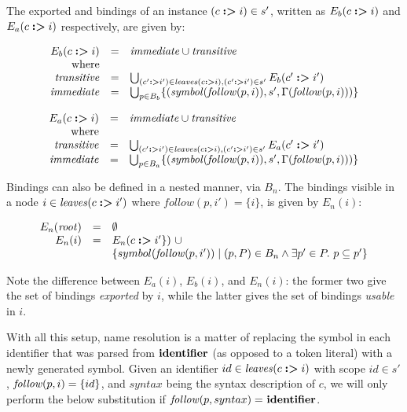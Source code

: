 \documentclass{kththesis}
\begin{document}
The exported  and  bindings of an instance $(c \mathrel{\textbf{:>}} i) \in s'$, written as $E_b(c \mathrel{\textbf{:>}} i)$ and $E_a(c \mathrel{\textbf{:>}} i)$ respectively, are given by:

$$
\begin{array}{rcl}
E_b(c \mathrel{\textbf{:>}} i) & = & \mathit{immediate} \cup \mathit{transitive} \\
\text{where} & & \\
\mathit{transitive} & = & \bigcup_{(c' \mathrel{\textbf{:>}} i') \in \mathit{leaves}(c \mathrel{\textbf{:>}} i), (c' \mathrel{\textbf{:>}} i') \in s'} E_b(c' \mathrel{\textbf{:>}} i') \\
\mathit{immediate} & = & \bigcup_{p \in B_b} \{(\mathit{symbol}(\mathit{follow}(p, i)), s', \Gamma(\mathit{follow}(p, i)))\}
\end{array}
$$

$$
\begin{array}{rcl}
E_a(c \mathrel{\textbf{:>}} i) & = & \mathit{immediate} \cup \mathit{transitive} \\
\text{where} & & \\
\mathit{transitive} & = & \bigcup_{(c' \mathrel{\textbf{:>}} i') \in \mathit{leaves}(c \mathrel{\textbf{:>}} i), (c' \mathrel{\textbf{:>}} i') \in s'} E_a(c' \mathrel{\textbf{:>}} i') \\
\mathit{immediate} & = & \bigcup_{p \in B_a} \{(\mathit{symbol}(\mathit{follow}(p, i)), s', \Gamma(\mathit{follow}(p, i)))\}
\end{array}
$$

Bindings can also be defined in a nested manner, via $B_n$. The bindings visible in a node $i \in \mathit{leaves}(c \mathrel{\textbf{:>}} i')$ where $follow(p, i') = \{i\}$, is given by $E_n(i)$:

$$
\begin{array}{rcl}
E_n(\mathit{root}) & = & \emptyset \\
E_n(i) & = & E_n(c \mathrel{\textbf{:>}} i'\})\ \cup \\
& & \{ symbol(\mathit{follow}(p, i')) \mid (p, P) \in B_n \land \exists p' \in P.\ p \subseteq p'\} \\
\end{array}
$$

Note the difference between $E_a(i)$, $E_b(i)$, and $E_n(i)$: the former two give the set of bindings \emph{exported} by $i$, while the latter gives the set of bindings \emph{usable} in $i$.


With all this setup, name resolution is a matter of replacing the symbol in each identifier that was parsed from $\mathrel{\mathbf{identifier}}$ (as opposed to a token literal) with a newly generated symbol. Given an identifier $id \in \mathit{leaves}(c \mathrel{\textbf{:>}} i)$ with scope $id \in s'$, $\mathit{follow}(p, i) = \{id\}$, and $syntax$ being the syntax description of $c$, we will only perform the below substitution if $\mathit{follow}(p, syntax) =\ \mathrel{\mathbf{identifier}}$.
\end{document}
